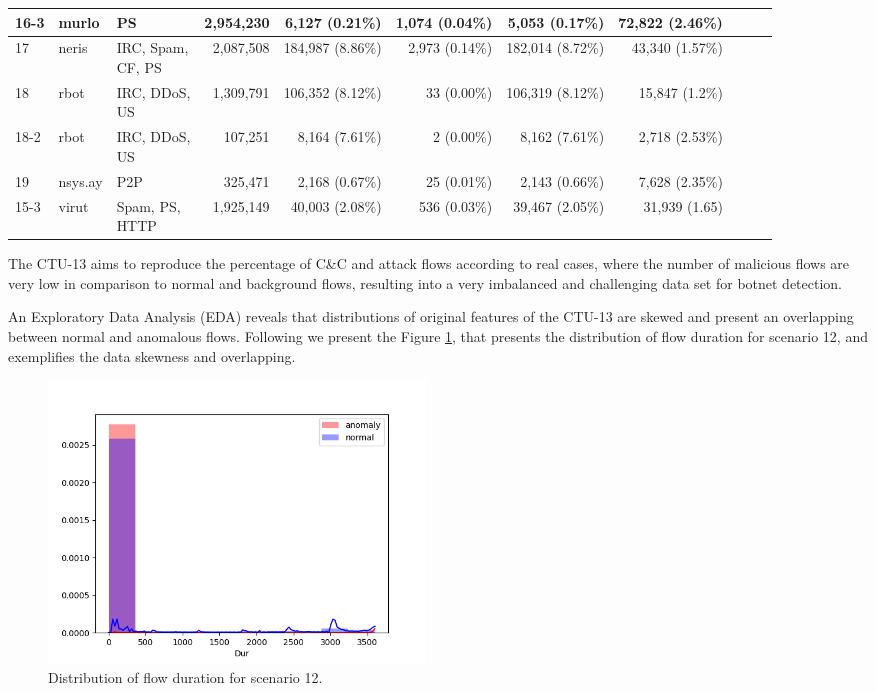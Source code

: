 \documentclass[review]{elsarticle}
\begin{document}
\begin{table}[h!]
\begin{tabular}{| l | l | l | r | r | r | r | r | r | r | r | }
			16-3 & murlo &PS & 2,954,230 & 6,127 (0.21\%) & 1,074 (0.04\%) & 5,053 (0.17\%) &72,822 (2.46\%)\\ \hline
			17 & neris &\makecell[l]{IRC, Spam,\\CF, PS} & 2,087,508 & 184,987 (8.86\%) & 2,973 (0.14\%) & 182,014 (8.72\%) &43,340 (1.57\%)\\ \hline
			18 & rbot &\makecell[l]{IRC, DDoS,\\US} & 1,309,791 & 106,352 (8.12\%) & 33 (0.00\%) & 106,319 (8.12\%) &15,847 (1.2\%)\\ \hline
			18-2 & rbot &\makecell[l]{IRC, DDoS,\\US} & 107,251 & 8,164 (7.61\%) & 2 (0.00\%) & 8,162 (7.61\%) &2,718 (2.53\%)\\ \hline
			19 & nsys.ay &P2P & 325,471 & 2,168 (0.67\%) & 25 (0.01\%) & 2,143 (0.66\%) &7,628 (2.35\%)\\ \hline
			15-3 & virut &\makecell[l]{Spam, PS,\\HTTP} & 1,925,149 & 40,003 (2.08\%) & 536 (0.03\%) & 39,467 (2.05\%) &31,939 (1.65)\\ \hline
	\end{tabular}
\end{table}

The CTU-13 aims to reproduce the percentage of C\&C and attack flows according to real cases, where the number of malicious flows are very low in comparison to normal and background flows, resulting into a very imbalanced and challenging data set for botnet detection. 

An Exploratory Data Analysis (EDA) reveals that distributions of original features of the CTU-13 are skewed and present an overlapping between normal and anomalous flows. Following we present the Figure \ref{fig:fig01}, that presents the distribution of flow duration for scenario 12, and exemplifies the data skewness and overlapping. 

\begin{figure}[h!]
     \centering
     \includegraphics[width=10cm]{figures/raw_distplot_capture20110812_Dur.png}
     \caption{Distribution of flow duration for scenario 12.}
     \label{fig:fig01}
\end{figure}
\end{document}
